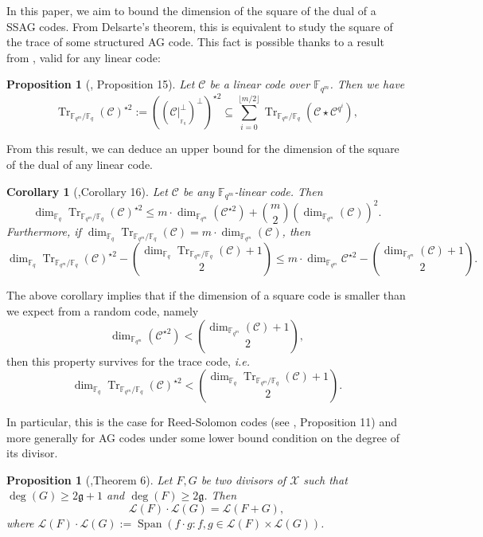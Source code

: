 \documentclass[a4paper]{article}
\newtheorem{proposition}[thm]{Proposition}
\newtheorem{coro}[thm]{Corollary}
\theoremstyle{definition}
\theoremstyle{remark}
\newcommand{\calL}{\mathcal{L}}
\newcommand{\calC}{\mathcal{C}}
\newcommand{\calX}{\mathcal{X}}
\newcommand{\fqm}{\mathbb{F}_{q^m}}
\newcommand{\fq}{\mathbb{F}_{q}}
\newcommand{\Tr}[1]{\operatorname{Tr}_{\mathbb{F}_{q^m}/\fq}\left(#1\right)}
\newcommand{\Span}[1]{\operatorname{Span}\left(#1\right)}
\begin{document}
In this paper, we aim to bound the dimension of the square of the dual of a SSAG codes. From Delsarte's theorem, this is equivalent to study the square of the trace of some structured AG code. 
This fact is possible thanks to a result from \cite{MT21}, valid for any linear code:

\begin{proposition}[\cite{MT21}, Proposition 15] \label{prop:Tr_BoundSchurSquare}
	Let $\calC$ be a linear code over $\fqm$. Then we have 
	\begin{equation} \label{eq:key_equation} \Tr{\calC}^{\star2} := ((\calC|^{\perp}_{_{{\mathbb{F}_q}}})^{\perp})^{\star2} \subseteq \sum\limits_{i=0}^{\lfloor{m/2} \rfloor} \Tr{\calC\star \calC^{q^i}},
	\end{equation}
\end{proposition}

From this result, we can deduce an upper bound for the dimension of the square of the dual of any linear code.

\begin{coro} [\cite{MT21},Corollary 16]\label{coro:first_bound_square_of_trace}
	Let $\calC$ be any $\fqm$-linear code. Then 
	\begin{equation} \label{eq:mumford_bound}
		\dim_{\fq}\Tr{\calC}^{\star2} \leq m \cdot \dim_{\fqm}(\calC^{\star 2}) + \binom{m}{2} (\dim_{\fqm}(\calC))^2.
	\end{equation}
	Furthermore, if $\dim_{\fq} \Tr{\calC} = m \cdot \dim_{\fqm}(\calC)$, then 
	\[\dim_{\fq} \Tr{\calC}^{\star2} - \binom{\dim_{\fq} \Tr{\calC}+1}{2} \leq m \cdot \dim_{\fqm} \calC^{\star 2} - \binom{\dim_{\fqm} (\calC)+1}{2}.\]
\end{coro}

The above corollary implies that if the dimension of a square code is smaller than we expect from a random code, namely
\[ \dim_{\fqm} (\calC^{\star 2}) < \binom{\dim_{\fqm} (\calC)+1}{2},\]
then this property survives for the trace code, \emph{i.e.}
\[\dim_{\fq} \Tr{\calC}^{\star 2} < \binom{\dim_{\fq} \Tr{\calC}+1}{2}.\]

In particular, this is the case for Reed-Solomon codes (see \cite{MT21}, Proposition 11) and more generally for AG codes under some lower bound condition on the degree of its divisor.


\begin{proposition} [\cite{Mum70},Theorem 6] \label{prop:mumford_result}
	Let $F,G$ be two divisors of $\calX$ such that $\deg(G) \geq 2\mathfrak{g}+1$ and $\deg(F) \geq 2\mathfrak{g}$. Then
	\[ \calL(F) \cdot \calL(G) = \calL(F+G),\]
	where $\calL(F) \cdot \calL(G) := \Span{ f \cdot g : f,g \in \calL(F) \times \calL(G)}$.
\end{proposition}
\end{document}
